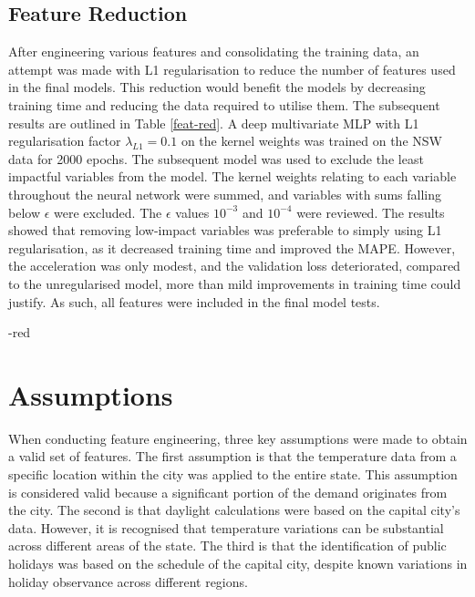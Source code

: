 \documentclass[mstat,12pt]{unswthesis}
\begin{document}
\hypertarget{features-reduction}{%
\subsection{Feature Reduction}\label{features-reduction}}

After engineering various features and consolidating the training data, an attempt was made with L1 regularisation to reduce the number of features used in the final models. This reduction would benefit the models by decreasing training time and reducing the data required to utilise them. The subsequent results are outlined in Table \ref{feat-red}. A deep multivariate MLP with L1 regularisation factor $\lambda_{L1}=0.1$ on the kernel weights was trained on the NSW data for 2000 epochs. The subsequent model was used to exclude the least impactful variables from the model. The kernel weights relating to each variable throughout the neural network were summed, and variables with sums falling below $\epsilon$ were excluded. The $\epsilon$ values $10^{-3}$ and $10^{-4}$ were reviewed. The results showed that removing low-impact variables was preferable to simply using L1 regularisation, as it decreased training time and improved the MAPE. However, the acceleration was only modest, and the validation loss deteriorated, compared to the unregularised model, more than mild improvements in training time could justify. As such, all features were included in the final model tests.

 \feat-red

\hypertarget{assumptions}{%
\section{Assumptions}\label{assumptions}}
When conducting feature engineering, three key assumptions were made to obtain a valid set of features. The first assumption is that the temperature data from a specific location within the city was applied to the entire state. This assumption is considered valid because a significant portion of the demand originates from the city. The second is that daylight calculations were based on the capital city's data. However, it is recognised that temperature variations can be substantial across different areas of the state. The third is that the identification of public holidays was based on the schedule of the capital city, despite known variations in holiday observance across different regions. 
\end{document}
